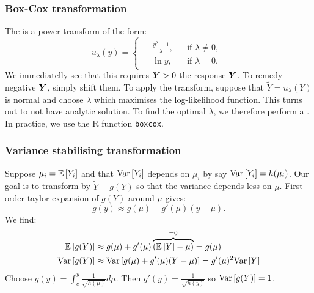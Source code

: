 \subsubsection{Box-Cox transformation}
The  is a power transform of the form:
\begin{equation}
    \boxed{
        u_{\lambda}(y) =
        \begin{cases}
            \begin{aligned}
                &\frac{y^\lambda-1}{\lambda}, && \text{if } \lambda \ne 0, \\
                &\ln{y}, && \text{if } \lambda = 0.
            \end{aligned}
        \end{cases}        
    }
\end{equation}
We immediatelly see that this requires $\boldsymbol{Y}>0$ the response $\boldsymbol{Y}$. To remedy negative $\boldsymbol{Y}$, simply shift them. To apply the transform, suppose that $\tilde{Y} = u_{\lambda}(Y)$ is normal and choose $\lambda$ which maximises the log-likelihood function. This turns out to not have analytic solution. 
To find the optimal $\lambda$, we therefore perform a . In practice, we use the R function \texttt{boxcox}. 

\subsubsection{Variance stabilising transformation}

Suppose $\mu_i=\mathbb{E}\left[Y_i\right]$ and that $\mathrm{Var}\left[Y_i\right]$ depends on $\mu_i$ by say $\mathrm{Var}\left[Y_i\right]=h(\mu_i)$. Our goal is to transform by $\tilde{Y} = g(Y)$ so that the variance depends less on $\mu$. First order taylor expansion of $g(Y)$ around $\mu$ gives:
$$
    g(y) \approx g(\mu) + g'(\mu)(y-\mu).
$$ 
We find:
\begin{align*}
    \mathbb{E}\left[g(Y)\right] &\approx g(\mu) + g'(\mu)\overbrace{(\mathbb{E}\left[Y\right]-\mu )}^{=0} = g(\mu) 
    \\
    \mathrm{Var}\left[g(Y)\right] &\approx \mathrm{Var}\left[g(\mu) + g'(\mu)(Y-\mu)\right] = g'(\mu)^2\mathrm{Var}\left[Y\right] 
\end{align*}
Choose $g(y)=\int_c^y \frac{1}{\sqrt{h(\mu)}}d\mu$. Then $g'(y) = \frac{1}{\sqrt{h(y)}}$ so $\mathrm{Var}\left[g(Y)\right] = 1$.
